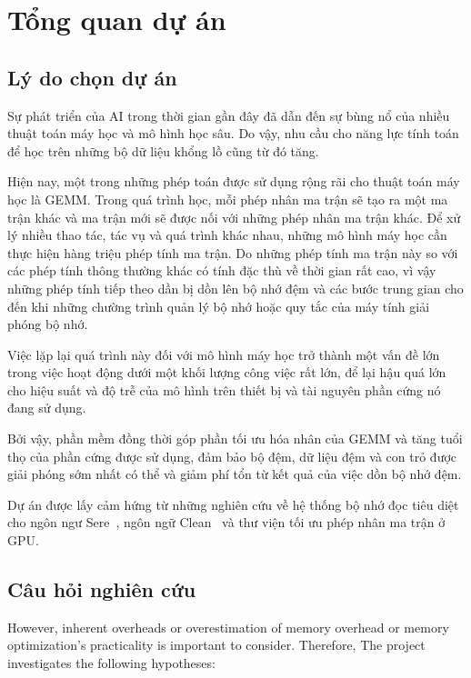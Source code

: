 \documentclass[a4paper]{article}
\begin{document}
	
	\newpage
	
	\section{Tổng quan dự án}
	\label{sec:tongquan}
	
	\subsection{Lý do chọn dự án}
	
        Sự phát triển của AI trong thời gian gần đây đã dẫn đến sự bùng nổ của nhiều thuật toán máy học và mô hình học sâu. Do vậy, nhu 
        cầu cho năng lực tính toán để học trên những bộ dữ liệu khổng lồ
        cũng từ đó tăng.
		
		Hiện nay, một trong những phép toán được sử dụng rộng rãi cho thuật toán máy học là GEMM. Trong quá trình học, mỗi phép nhân ma trận sẽ tạo ra một ma trận khác và ma trận mới sẽ được nối với những phép nhân ma trận khác. Để xử lý nhiều thao tác, tác vụ và quá trình khác nhau, những mô hình máy học cần thực hiện hàng triệu phép tính ma trận. Do những phép tính ma trận này so với các phép tính thông thường khác có tính đặc thù về thời gian rất cao, vì vậy những phép tính tiếp theo dần bị dồn lên bộ nhớ đệm và các bước trung gian cho đến khi những chường trình quản lý bộ nhớ hoặc quy tắc của máy tính giải phóng bộ nhớ.
        
        Việc lặp lại quá trình này đối với mô hình máy học trở thành một vấn đề lớn trong việc hoạt động dưới một khối lượng công việc rất lớn, để lại hậu quá lớn cho hiệu suất và độ trễ của mô hình trên thiết bị và tài nguyên phần cứng nó đang sử dụng.

        Bởi vậy, phần mềm đồng thời góp phần tối ưu hóa nhân của GEMM và tăng tuổi thọ của phần cứng được sử dụng, đảm bảo bộ đệm, dữ liệu đệm và con trỏ được giải phóng sớm nhất có thể và giảm phí tổn từ kết quả của việc dồn bộ nhớ đệm.

	    Dự án được lấy cảm hứng từ những nghiên cứu về hệ thống bộ nhớ đọc tiêu diệt cho ngôn ngư Sere~\cite{sere}, ngôn ngữ Clean~\cite{clean} và thư viện tối ưu phép nhân ma trận ở GPU.
	
	\subsection{Câu hỏi nghiên cứu}
	
	However, inherent overheads or overestimation of memory overhead or memory optimization's practicality is important to consider. Therefore, The project investigates the following hypotheses:
	
\end{document}
